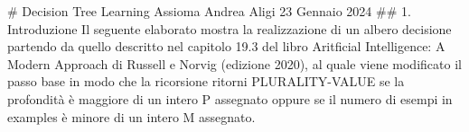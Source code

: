 # Decision Tree Learning
Assioma Andrea Aligi
23 Gennaio 2024
## 1. Introduzione
Il seguente elaborato mostra la realizzazione di un albero decisione partendo da quello descritto nel capitolo 19.3 del libro Aritficial Intelligence: A Modern Approach di 
Russell e Norvig (edizione 2020), al quale viene modificato il passo base in modo che la ricorsione ritorni PLURALITY-VALUE se la profondità è maggiore di un intero P 
assegnato oppure se il numero di esempi in examples è minore di un intero M assegnato.

